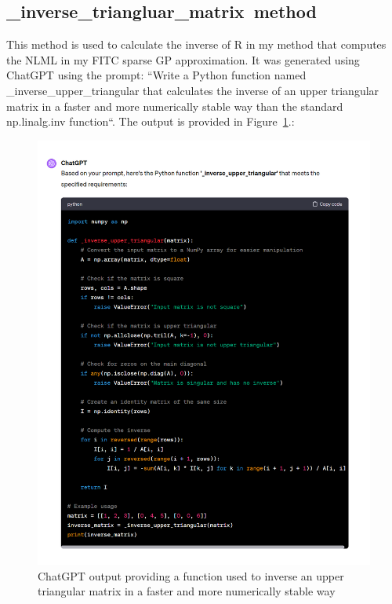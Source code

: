 \documentclass[12pt]{article}
\begin{document}
    \subsection{\_inverse\_triangluar\_matrix\ method}
    This method is used to calculate the inverse of R in my method that computes the NLML in my FITC sparse GP approximation.
    It was generated using ChatGPT using the prompt: ``Write a Python function named \_inverse\_upper\_triangular that calculates the inverse of an upper triangular matrix in a faster and more numerically stable way than the standard np.linalg.inv function``.
    The output is provided in Figure~\ref{fig:chat-iut}.:
    \begin{figure}[H]
        \centering
        \includegraphics[width=1.1\linewidth]{figures/chat-iut/chat-iut.png}
        \caption{ChatGPT output providing a function used to inverse an upper triangular matrix in a faster and more numerically stable way}
        \label{fig:chat-iut}
    \end{figure}
\end{document}
